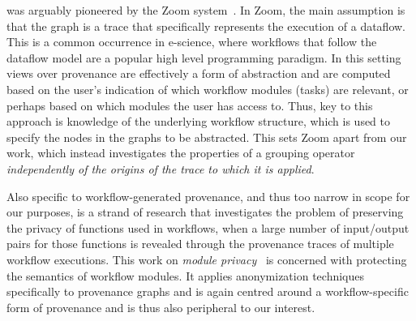 


was arguably pioneered by the Zoom system~\citep{DBLP:conf/icde/BitonBDH08}. In Zoom, the main assumption is that  the graph is a trace that specifically represents the execution of a dataflow. This is a common occurrence in e-science, where workflows that follow the  dataflow model are a popular high level programming paradigm.
%
In this setting views over provenance are effectively a form of abstraction and are computed based on the user's indication of which workflow modules (tasks) are relevant, or perhaps based on which modules the user has access to. Thus, key to this approach is knowledge of the underlying workflow structure, which is used to specify the nodes in the graphs to be abstracted. This sets Zoom apart from our work, which instead investigates the properties of a grouping operator \textit{independently of the origins of the trace to which it is applied}. 

Also specific to workflow-generated provenance, and thus too narrow in scope for our purposes, is a  strand of research that investigates the problem of preserving the privacy of functions used in workflows, when a large number of input/output pairs for those functions is revealed through the provenance traces of multiple workflow executions. This work on  \textit{module privacy}~\citep{Davidson:2011:PP:1938551.1938554,Davidson2010a,Davidson:2011:PVM:1989284.1989305} is concerned with protecting the semantics of workflow modules. 
It applies anonymization techniques specifically to provenance graphs and is again centred around a workflow-specific form of provenance and  is thus also peripheral to our interest.

%



